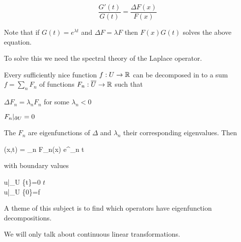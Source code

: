 \[\frac{G'(t)}{G(t)} = \frac{\Delta F(x)}{F(x)}\]

Note that if $G(t) = e^{\lambda t}$ and $\Delta F = \lambda F$ then $F(x)G(t)$ solves the above equation.

To solve this we need the spectral theory of the Laplace operator.

\begin{prop}
	Every sufficiently nice function $f: U \to \mathbb{R}$ can be decomposed in to a sum $f=\sum_n F_n$ of functions $F_n: \overline U \to \mathbb{R}$ such that
	\begin{itm}
		\item $\Delta F_n = \lambda_n F_n$ for some $\lambda_n < 0$
		\item $F_n|_{\partial U} = 0$
	\end{itm}
	The $F_n$ are eigenfunctions of $\Delta$ and $\lambda_n$ their corresponding eigenvalues.
	Then
	\begin{eqn}
		(x,t) = \sum_n F_n(x) e^{\lambda_n t}
	\end{eqn}
	with boundary values
	\begin{eqn}
		\begin{cases}
			u|_{\p U \times \{t\}}=0 \text{ for all } $t$ \\
			u|_{\p U \times \{0\}}=f
		\end{cases}
	\end{eqn}
\end{prop}

A theme of this subject is to find which operators have eigenfunction decompositions.

We will only talk about continuous linear transformations.
